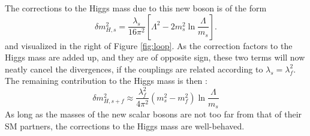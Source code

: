 The corrections to the Higgs mass due to this new boson is of the form
\begin{equation}
\delta m_{H,s}^{2}=\frac{\lambda_{s}}{16\pi^{2}}\left[\Lambda^{2}-2m_{s}^{2}\ln\frac{\Lambda}{m_{s}}\right].
\end{equation}                                                                                                                 
and visualized in the right of Figure \ref{fig:loop}. 
As the correction factors to the Higgs mass are added up, and they are of opposite sign, these two terms will now neatly cancel the divergences, if the couplings are related according to $\lambda_{s}=\lambda_{f}^{2}$. 
The remaining contribution to the Higgs mass is then \cite{Pape:2006ar}:
\begin{equation}
\delta m_{H,s+f}^{2}\approx\frac{\lambda_{f}^{2}}{4\pi^{2}}(m_{s}^{2}-m_{f}^{2})\ln\frac{\Lambda}{m_{s}}
\end{equation}                                                                                                                 
As long as the masses of the new scalar bosons are not too far from that of their SM partners, the corrections to the Higgs mass are well-behaved.
